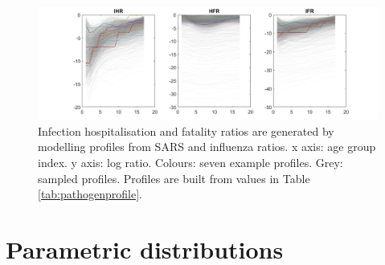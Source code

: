 \documentclass[
]{article}
\begin{document}
\begin{figure}
\centering
\includegraphics{README_files/figure-gfm/ratesbyage.jpeg}
\caption{\label{fig:ratesbyage} Infection hospitalisation and fatality ratios are generated by modelling profiles from SARS and influenza ratios. x axis: age group index. y axis: log ratio. Colours: seven example profiles. Grey: sampled profiles. Profiles are built from values in Table \ref{tab:pathogenprofile}.}
\end{figure}

\section{Parametric distributions}\label{parametric-distributions}
\end{document}
